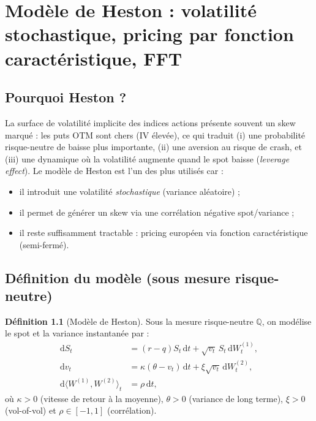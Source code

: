 \documentclass[11pt,a4paper]{report}
\newcommand{\dd}{\mathrm{d}}
\newcommand{\Q}{\mathbb{Q}}
\newcommand{\1}{\mathbbm{1}}
\theoremstyle{definition}
\newtheorem{definition}{Définition}[chapter]
\theoremstyle{plain}
\theoremstyle{remark}
\begin{document}
\chapter{Modèle de Heston : volatilité stochastique, pricing par fonction caractéristique, FFT}
\label{chap:heston}

\section{Pourquoi Heston ?}
La surface de volatilité implicite des indices actions présente souvent un skew marqué : les puts OTM sont chers (IV élevée),
ce qui traduit (i) une probabilité risque-neutre de baisse plus importante, (ii) une aversion au risque de crash,
et (iii) une dynamique où la volatilité augmente quand le spot baisse (\emph{leverage effect}).
Le modèle de Heston est l'un des plus utilisés car :
\begin{itemize}
  \item il introduit une volatilité \emph{stochastique} (variance aléatoire) ;
  \item il permet de générer un skew via une corrélation négative spot/variance ;
  \item il reste suffisamment tractable : pricing européen via fonction caractéristique (semi-fermé).
\end{itemize}

\section{Définition du modèle (sous mesure risque-neutre)}
\label{sec:heston_sde}
\begin{definition}[Modèle de Heston]
Sous la mesure risque-neutre $\Q$, on modélise le spot et la variance instantanée par :
\begin{align*}
\dd S_t &= (r-q)S_t\,\dd t + \sqrt{v_t}\,S_t\,\dd W_t^{(1)},\\
\dd v_t &= \kappa(\theta - v_t)\,\dd t + \xi \sqrt{v_t}\,\dd W_t^{(2)},\\
\dd\langle W^{(1)},W^{(2)}\rangle_t &= \rho\,\dd t,
\end{align*}
où $\kappa>0$ (vitesse de retour à la moyenne), $\theta>0$ (variance de long terme),
$\xi>0$ (vol-of-vol) et $\rho\in[-1,1]$ (corrélation).
\end{definition}
\end{document}
